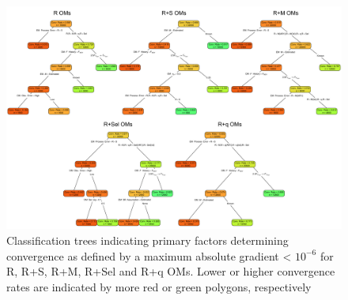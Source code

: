 \documentclass[
  12pt,
]{article}
\begin{document}
\begin{landscape}
\begin{figure}
\begin{center}
\includegraphics[width = 1.4\textwidth]{convergence_gradient_classification_plots}
\end{center}
\caption{Classification trees indicating primary factors determining convergence as defined by a maximum absolute gradient < $10^{-6}$ for R, R+S, R+M, R+Sel and R+q OMs. Lower or higher convergence rates are indicated by more red or green polygons, respectively}\label{conv_gradient_class}
\end{figure}
\end{landscape}
\end{document}
